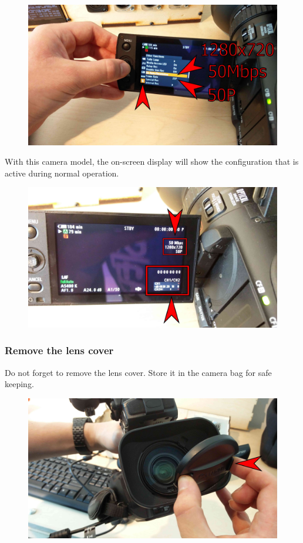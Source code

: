 \documentclass{article}
\begin{document}
\begin{figure}[H]
  \centering
\includegraphics[width = 120mm]{Canon05.jpg}
\end{figure}

With this camera model, the on-screen display will show the configuration that is active during normal operation.
\begin{figure}[H]
  \centering
\includegraphics[width = 120mm]{Canon06.jpg}
\end{figure}

\subsubsection{Remove the lens cover}
Do not forget to remove the lens cover. Store it in the camera bag for safe keeping.

\begin{figure}[H]
  \centering
\includegraphics[width = 120mm]{Canon07.jpg}
\end{figure}
\end{document}
